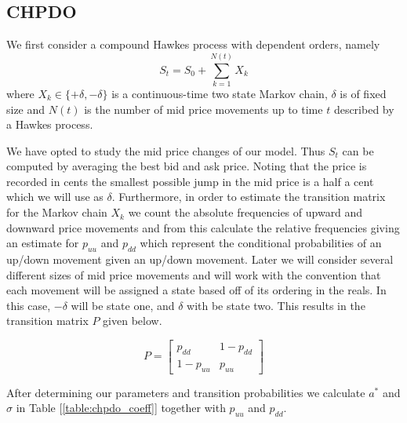 \documentclass{article}
\begin{document}


\subsection*{CHPDO}

We first consider a compound Hawkes process with dependent orders, namely
\begin{equation}
    S_t = S_0 + \sum_{k=1}^{N(t)}X_k
\end{equation}
where $X_k\in\{+\delta, -\delta\}$ is a continuous-time two state Markov chain, $\delta$ is of fixed size and $N(t)$ is the number of mid price movements up to time $t$ described by a Hawkes process.

We have opted to study the mid price changes of our model. Thus $S_t$ can be computed by averaging the best bid and ask price. Noting that the price is recorded in cents the smallest possible jump in the mid price is a half a cent which we will use as $\delta$. Furthermore, in order to estimate the transition matrix for the Markov chain $X_k$ we count the absolute frequencies of upward and downward price movements and from this calculate the relative frequencies giving an estimate for $p_{uu}$ and $p_{dd}$ which represent the conditional probabilities of an up/down movement given an up/down movement. Later we will consider several different sizes of mid price movements and will work with the convention that each movement will be assigned a state based off of its ordering in the reals. In this case, $-\delta$ will be state one, and $\delta$ with be state two. This results in the transition matrix $P$ given below.

\[P =
\begin{bmatrix}
p_{dd} & 1-p_{dd}\\
1-p_{uu} & p_{uu}
\end{bmatrix}
\]

After determining our parameters and transition probabilities we calculate $a^*$ and $\sigma$ in Table [\ref{table:chpdo_coeff}] together with $p_{uu}$ and $p_{dd}$.


\end{document}
